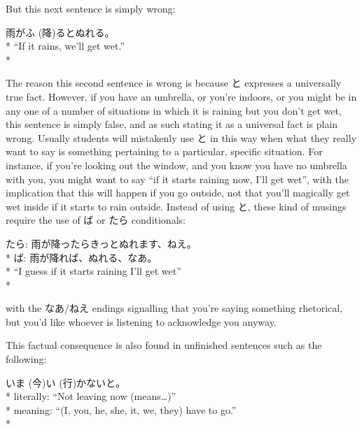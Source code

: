 \documentclass[11pt, b5paper, twoside, openright, onecolumn]{book}
\makeatletter
\newcommand*{\rubystack}[2]{{\relscale{0.5}%
  \begin{tabular}[b]{@{}c@{}}%
    {#1}\\%
   {\textscale{2}{#2}}%
  \end{tabular}}%
}
\DeclareRobustCommand*{\ruby}[2]{%
  \mbox{%
    \setlength{\parskip}{0ex}%
    \BeginAccSupp{method=pdfstringdef,ActualText={#1}}%
      \rubystack{\phantom{#2}}{#1}%
      \llap{%
        \rubystack{#2}{\phantom{#1}}%
      }%
    \EndAccSupp{}%
  }%
}
\renewcommand*{\ruby}[2]{#2 (#1)}%
\newenvironment{exampleblock}{
\setlength{\parindent}{0.6in}
\begin{minipage}[t]{\dimexpr\textwidth-\parindent}}
{\end{minipage}}
\makeatother
\begin{document}
But this next sentence is simply wrong:

\vspace{0.4cm}
\begin{exampleblock}
雨が\ruby{降}{ふ}るとぬれる。 \\* 
“If it rains‚ we’ll get wet.” \\* 
\end{exampleblock}
\vspace{0.2cm}

The reason this second sentence is wrong is because と expresses a universally true fact. However‚ if you have an umbrella‚ or you’re indoors‚ or you might be in any one of a number of situations in which it is raining but you don’t get wet‚ this sentence is simply false‚ and as such stating it as a universal fact is plain wrong. Usually students will mistakenly use と in this way when what they really want to say is something pertaining to a particular‚ specific situation. For instance‚ if you’re looking out the window‚ and you know you have no umbrella with you‚ you might want to say “if it starts raining now‚ I’ll get wet”‚ with the implication that this will happen if you go outside‚ not that you’ll magically get wet inside if it starts to rain outside. Instead of using と‚ these kind of musings require the use of ば or たら conditionals:

\vspace{0.4cm}
\begin{exampleblock}
たら: 雨が降ったらきっとぬれます、ねえ。 \\* 
ば: 雨が降れば、ぬれる、なあ。 \\* 
“I guess if it starts raining I’ll get wet” \\* 
\end{exampleblock}
\vspace{0.2cm}

with the なあ/ねえ endings signalling that you’re saying something rhetorical‚ but you’d like whoever is listening to acknowledge you anyway.

This factual consequence is also found in unfinished sentences such as the following:

\vspace{0.4cm}
\begin{exampleblock}
\ruby{今}{いま}\ruby{行}{い}かないと。 \\* 
literally: “Not leaving now (means…)” \\* 
meaning: “(I‚ you‚ he‚ she‚ it‚ we‚ they) have to go.” \\* 
\end{exampleblock}
\vspace{0.2cm}
\end{document}
